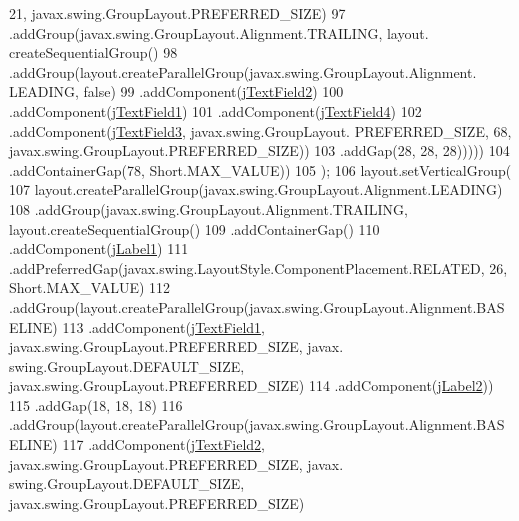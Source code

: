 \begin{DoxyCode}
      21, javax.swing.GroupLayout.PREFERRED\_SIZE)
97                             .addGroup(javax.swing.GroupLayout.Alignment.TRAILING, layout.
      createSequentialGroup()
98                                 .addGroup(layout.createParallelGroup(javax.swing.GroupLayout.Alignment.
      LEADING, \textcolor{keyword}{false})
99                                     .addComponent(\mbox{\hyperlink{class_interfaz_package_1_1_alta_lectores_a3f30dbff470e9749421774f5da8d8833}{jTextField2}})
100                                     .addComponent(\mbox{\hyperlink{class_interfaz_package_1_1_alta_lectores_ac08649a21b3eae20582e25d3fb7a1ed9}{jTextField1}})
101                                     .addComponent(\mbox{\hyperlink{class_interfaz_package_1_1_alta_lectores_a933106873681982ae326743f58efd3d5}{jTextField4}})
102                                     .addComponent(\mbox{\hyperlink{class_interfaz_package_1_1_alta_lectores_a1043b2ff62e3dcae79fb652d7891a131}{jTextField3}}, javax.swing.GroupLayout.
      PREFERRED\_SIZE, 68, javax.swing.GroupLayout.PREFERRED\_SIZE))
103                                 .addGap(28, 28, 28)))))
104                 .addContainerGap(78, Short.MAX\_VALUE))
105         );
106         layout.setVerticalGroup(
107             layout.createParallelGroup(javax.swing.GroupLayout.Alignment.LEADING)
108             .addGroup(javax.swing.GroupLayout.Alignment.TRAILING, layout.createSequentialGroup()
109                 .addContainerGap()
110                 .addComponent(\mbox{\hyperlink{class_interfaz_package_1_1_alta_lectores_a3c66bd5bf27274226564fa37c644c9e7}{jLabel1}})
111                 .addPreferredGap(javax.swing.LayoutStyle.ComponentPlacement.RELATED, 26, Short.MAX\_VALUE)
112                 .addGroup(layout.createParallelGroup(javax.swing.GroupLayout.Alignment.BASELINE)
113                     .addComponent(\mbox{\hyperlink{class_interfaz_package_1_1_alta_lectores_ac08649a21b3eae20582e25d3fb7a1ed9}{jTextField1}}, javax.swing.GroupLayout.PREFERRED\_SIZE, javax.
      swing.GroupLayout.DEFAULT\_SIZE, javax.swing.GroupLayout.PREFERRED\_SIZE)
114                     .addComponent(\mbox{\hyperlink{class_interfaz_package_1_1_alta_lectores_adfb75b51296b24b4165ef9d2ffe4e9fd}{jLabel2}}))
115                 .addGap(18, 18, 18)
116                 .addGroup(layout.createParallelGroup(javax.swing.GroupLayout.Alignment.BASELINE)
117                     .addComponent(\mbox{\hyperlink{class_interfaz_package_1_1_alta_lectores_a3f30dbff470e9749421774f5da8d8833}{jTextField2}}, javax.swing.GroupLayout.PREFERRED\_SIZE, javax.
      swing.GroupLayout.DEFAULT\_SIZE, javax.swing.GroupLayout.PREFERRED\_SIZE)

\end{DoxyCode}
